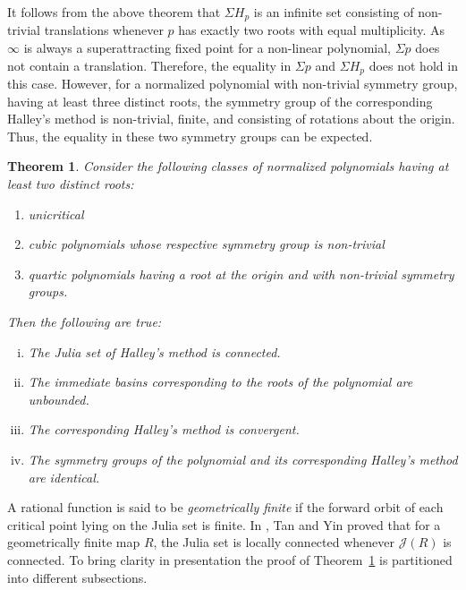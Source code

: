 \documentclass[12pt]{article}
\newtheorem{maintheorem}{Theorem}
\begin{document}
It follows from the above theorem that $\Sigma H_p$ is an infinite set consisting of non-trivial translations whenever $p$ has exactly two roots with equal multiplicity. As $\infty$ is always a superattracting fixed point for a non-linear polynomial, $\Sigma p$ does not contain a translation. Therefore, the equality in $\Sigma p$ and $\Sigma H_p$ does not hold in this case. However, for a normalized polynomial with non-trivial symmetry group, having at least three distinct roots, the symmetry group of the corresponding Halley's method is non-trivial, finite, and consisting of rotations about the origin. Thus, the equality in these two symmetry groups can be expected.
\begin{maintheorem}\label{m1}
	Consider the following classes of normalized polynomials having at least two distinct roots:
	\begin{enumerate}
		\item unicritical
		\item cubic polynomials whose respective symmetry group is non-trivial
		\item quartic polynomials having a root at the origin and with non-trivial symmetry groups.
	\end{enumerate}
	Then the following are true:
	\begin{enumerate}[(i)]
		\item The Julia set of Halley's method is connected.
		\item The immediate basins corresponding to the roots of the polynomial are unbounded.
		\item The corresponding Halley's method is convergent.
		\item The symmetry groups of the polynomial and its corresponding Halley's method are identical.
	\end{enumerate}
\end{maintheorem}
A rational function is said to be \textit{geometrically finite} if the forward orbit of each critical point lying on the Julia set is finite. In \cite[Theorem A]{Lei1996}, Tan and Yin proved that for a geometrically finite map $R$, the Julia set is locally connected whenever $\mathcal{J}(R)$ is connected. To bring clarity in presentation the proof of Theorem~\ref{m1} is partitioned into different subsections.
\end{document}
